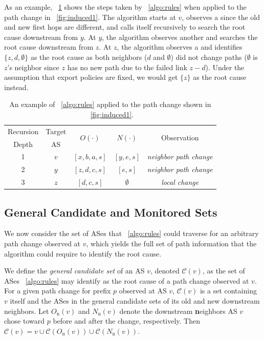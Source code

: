 As an example, \tab~\ref{tab:alg1.fig1} shows the steps taken by
\algstr~\ref{algo:rules} when applied to the path change in
\fig~\ref{fig:induced1}. The algorithm starts at $v$, observes a
\neighborC{} since the old and new first hops are different, and calls
itself recursively to search the root cause downstream from $y$.  At
$y$, the algorithm observes another \neighborC{} and
searches the root cause downstream from $z$. At $z$, the algorithm
observes a \localC{} and identifies $\{z, d, \emptyset\}$ as the
root cause as both neighbors ($d$ and $\emptyset$) did not change paths
($\emptyset$ is $z$'s neighbor since $z$ has no new path due to the
failed link $z-d$). Under the assumption that export policies are fixed,
we would get $\{z\}$ as the root cause instead.

\begin{table}[t]
\begin{center}
\begin{tabular}{ccccc}
Recursion & Target & \multirow{2}{*}{$O(\cdot)$} &
\multirow{2}{*}{$N(\cdot)$} &\multirow{2}{*}{Observation} \\
Depth & AS & & & \\
1 & $v$ & $[x, b, a, s]$ & $[y, e, s]$ & \emph{neighbor path change} \\
2 & $y$ & $[z, d, c, s]$ & $[e, s]$ & \emph{neighbor path change} \\
3 & $z$ & $[d, c, s]$ & $\emptyset$ & \emph{local change} \\
\end{tabular}
\caption{An example of \algstr~\ref{algo:rules} applied to the path change
shown in \fig~\ref{fig:induced1}.}
\label{tab:alg1.fig1}
\end{center}
\end{table}

\subsection{General Candidate and Monitored Sets}
\label{subsec:canopy}

We now consider the set of ASes that \algstr~\ref{algo:rules} could
traverse for an arbitrary path change observed at $v$, 
which yields the full set of path information that the algorithm could require 
to identify the root cause.

We define the \emph{general candidate set} of an AS $v$, denoted
$\mathcal{C}(v)$, as the set of ASes \algstr~\ref{algo:rules} may identify
as the root cause of a path change observed at $v$. For a given
path change for prefix $p$ observed at AS $v$, $\mathcal{C}(v)$ is a set
containing $v$ itself and the ASes in the general candidate sets of its
old and new 
downstream neighbors.  Let $O_{\mathrm{n}}(v)$ and $N_{\mathrm{n}}(v)$
denote the downstream \textbf{n}eighbors AS $v$ chose toward $p$ before and after
the change, respectively. Then $\mathcal{C}(v) = v \cup
\mathcal{C}(O_{\mathrm{n}}(v)) \cup \mathcal{C}(N_{\mathrm{n}}(v))$.
 
